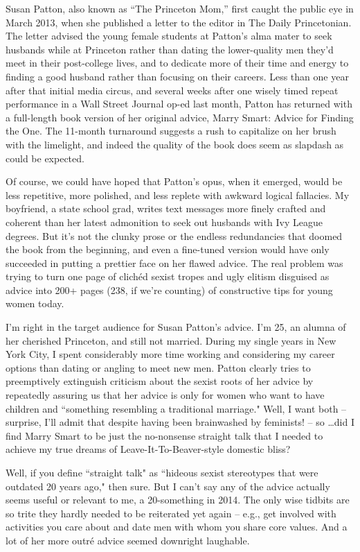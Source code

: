 \documentclass[12pt]{book}
\renewcommand{\indent}{\hspace{1cm}}
\begin{document}
\bigskip
\begin{linenumbers}
\modulolinenumbers[5]
Susan Patton, also known as “The Princeton Mom,” first caught the public eye in March 2013, when she published a letter to the editor in The Daily Princetonian. The letter advised the young female students at Patton's alma mater to seek husbands while at Princeton rather than dating the lower-quality men they'd meet in their post-college lives, and to dedicate more of their time and energy to finding a good husband rather than focusing on their careers. Less than one year after that initial media circus, and several weeks after one wisely timed repeat performance in a Wall Street Journal op-ed last month, Patton has returned with a full-length book version of her original advice, Marry Smart: Advice for Finding the One. The 11-month turnaround suggests a rush to capitalize on her brush with the limelight, and indeed the quality of the book does seem as slapdash as could be expected.

\indent Of course, we could have hoped that Patton's opus, when it emerged, would be less repetitive, more polished, and less replete with awkward logical fallacies. My boyfriend, a state school grad, writes text messages more finely crafted and coherent than her latest admonition to seek out husbands with Ivy League degrees. But it's not the clunky prose or the endless redundancies that doomed the book from the beginning, and even a fine-tuned version would have only succeeded in putting a prettier face on her flawed advice. The real problem was trying to turn one page of clichéd sexist tropes and ugly elitism disguised as advice into 200+ pages (238, if we're counting) of constructive tips for young women today.

\indent I'm right in the target audience for Susan Patton's advice. I'm 25, an alumna of her cherished Princeton, and still not married. During my single years in New York City, I spent considerably more time working and considering my career options than dating or angling to meet new men. Patton clearly tries to preemptively extinguish criticism about the sexist roots of her advice by repeatedly assuring us that her advice is only for women who want to have children and ``something resembling a traditional marriage." Well, I want both -- surprise, I'll admit that despite having been brainwashed by feminists! -- so \ldots did I find Marry Smart to be just the no-nonsense straight talk that I needed to achieve my true dreams of Leave-It-To-Beaver-style domestic bliss?

\indent Well, if you define ``straight talk" as ``hideous sexist stereotypes that were outdated 20 years ago," then sure. But I can't say any of the advice actually seems useful or relevant to me, a 20-something in 2014. The only wise tidbits are so trite they hardly needed to be reiterated yet again -- e.g., get involved with activities you care about and date men with whom you share core values. And a lot of her more outr\'e advice seemed downright laughable.
\end{linenumbers}
\end{document}
